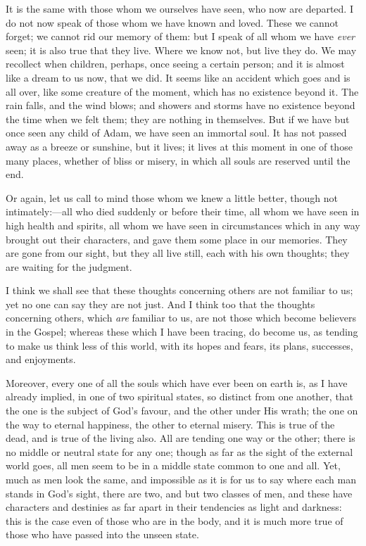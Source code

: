 It is the same with those whom we ourselves have seen, who now are
departed. I do not now speak of those whom we have known and loved.
These we cannot forget; we cannot rid our memory of them: but I speak
of all whom we have \emph{ever} seen; it is also true that they live.
Where we know not, but live they do. We may recollect when children,
perhaps, once seeing a certain person; and it is almost like a dream
to us now, that we did. It seems like an accident which goes and is
all over, like some creature of the moment, which has no existence
beyond it. The rain falls, and the wind blows; and showers and storms
have no existence beyond the time when we felt them; they are nothing
in themselves. But if we have but once seen any child of Adam, we have
seen an immortal soul. It has not passed away as a breeze or sunshine,
but it lives; it lives at this moment in one of those many places,
whether of bliss or misery, in which all souls are reserved until the
end.

Or again, let us call to mind those whom we knew a little better,
though not intimately:—all who died suddenly or before their time,
all whom we have seen in high health and spirits, all whom we have
seen in circumstances which in any way brought out their characters,
and gave them some place in our memories. They are gone from our
sight, but they all live still, each with his own thoughts; they are
waiting for the judgment.

I think we shall see that these thoughts concerning others are not
familiar to us; yet no one can say they are not just. And I think too
that the thoughts concerning others, which \emph{are} familiar to us, are not
those which become believers in the Gospel; whereas these which I have
been tracing, do become us, as tending to make us think less of this
world, with its hopes and fears, its plans, successes, and enjoyments.

Moreover, every one of all the souls which have ever been on earth
is, as I have already implied, in one of two spiritual states, so
distinct from one another, that the one is the subject of God's favour,
and the other under His wrath; the one on the way to eternal
happiness, the other to eternal misery. This is true of the dead, and
is true of the living also. All are tending one way or the other;
there is no middle or neutral state for any one; though as far as the
sight of the external world goes, all men seem to be in a middle state
common to one and all. Yet, much as men look the same, and impossible
as it is for us to say where each man stands in God's sight, there are
two, and but two classes of men, and these have characters and
destinies as far apart in their tendencies as light and darkness: this
is the case even of those who are in the body, and it is much more
true of those who have passed into the unseen state.

